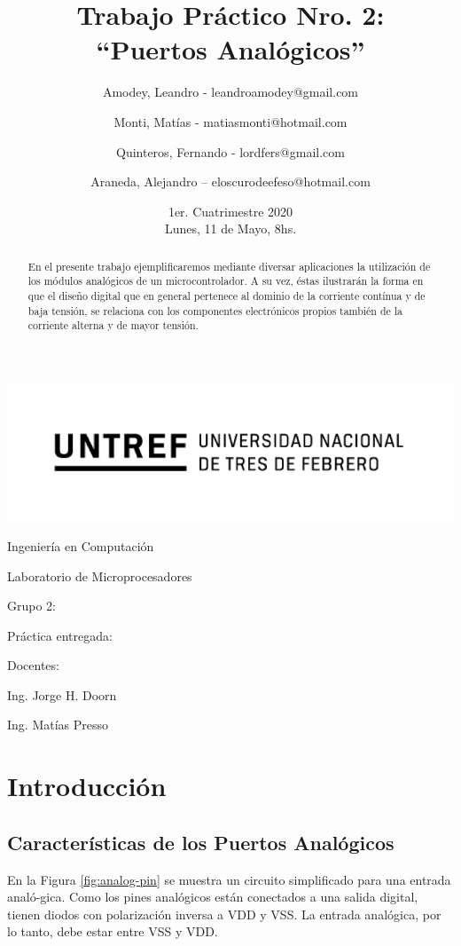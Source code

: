 \documentclass[a4paper]{article}
\title{Trabajo Práctico Nro. 2:\\“Puertos Analógicos”}
\author{Amodey, Leandro - leandroamodey@gmail.com
\and Monti, Matías - matiasmonti@hotmail.com
\and Quinteros, Fernando - lordfers@gmail.com
\and Araneda, Alejandro – eloscurodeefeso@hotmail.com}
\date{1er. Cuatrimestre 2020\\Lunes, 11 de Mayo, 8hs.}
\def\teacher{Ing. Jorge H. Doorn
\and Ing. Matías Presso}
\begin{document}

\begin{titlepage}\renewcommand\and\par\centering\makeatletter
    \includegraphics{logo.png}\par
    {\Large Ingeniería en Computación \par}\vspace{0.5cm}
    {\LARGE Laboratorio de Microprocesadores \par}\vfill
    {\huge \@title \par}\vfill
    Grupo 2:\par
    \@author\vfill
    Práctica entregada:\par
    \@date\vfill
    Docentes:\par
    \teacher\vspace{1cm}\makeatother
\end{titlepage}

\begin{abstract}

    En el presente trabajo ejemplificaremos mediante diversar 
    aplicaciones la utilización de los módulos analógicos de un 
    microcontrolador. A su vez, éstas ilustrarán la forma en que el 
    diseño digital que en general pertenece al dominio de la 
    corriente contínua y de baja tensión, se relaciona con los 
    componentes electrónicos propios también de la corriente alterna 
    y de mayor tensión.

\end{abstract}

\section{Introducción}

\subsection*{Características de los Puertos Analógicos}

En la Figura \ref{fig:analog-pin} se muestra un circuito simplificado
para una entrada analó-gica. Como los pines analógicos están conectados
a una salida digital, tienen diodos con polarización inversa a VDD y 
VSS. La entrada analógica, por lo tanto, debe estar entre VSS y VDD.
\end{document}
